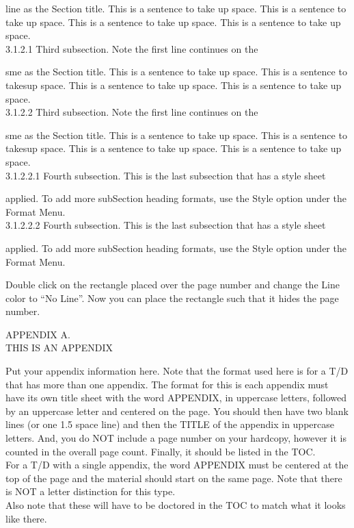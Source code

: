 \documentclass{article}
\newcommand{\tab}{\hspace{5mm}}
\begin{document}
line as the Section title. This is a sentence to take up space. 
This is a sentence to take up space. This is a sentence to take 
up space. This is a sentence to take up space.\\
3.1.2.1\tab 
Third subsection. Note the first line continues on the


sme as the Section title. This is a sentence to take up space. 
This is a sentence to takesup space. This is a sentence to take 
up space. This is a sentence to take up space.\\
3.1.2.2\tab 
Third subsection. Note the first line continues on the


sme as the Section title. This is a sentence to take up space. 
This is a sentence to takesup space. This is a sentence to take 
up space. This is a sentence to take up space.\\
3.1.2.2.1\tab 
Fourth subsection. This is the last subsection that has a style 
sheet 


applied. To add more subSection heading formats, use the Style 
option under the Format Menu.\\
3.1.2.2.2\tab 
Fourth subsection. This is the last subsection that has a style 
sheet 


applied. To add more subSection heading formats, use the Style 
option under the Format Menu.


\newpage

Double click on the rectangle placed over the page number and 
change the Line color to ``No Line''. Now you can place the rectangle 
such that it hides the page number.


APPENDIX A.\\
THIS IS AN APPENDIX


\newpage
Put your appendix information here. Note that the format used 
here is for a T/D that has more than one appendix. The format 
for this is each appendix must have its own title sheet with 
the word APPENDIX, in uppercase letters, followed by an uppercase 
letter and centered on the page. You should then have two blank 
lines (or one 1.5 space line) and then the TITLE of the appendix 
in uppercase letters. And, you do NOT include a page number on 
your hardcopy, however it is counted in the overall page count. 
Finally, it should be listed in the TOC.\\
For a T/D with a single appendix, the word APPENDIX must be centered 
at the top of the page and the material should start on the same 
page. Note that there is NOT a letter distinction for this type.\\
Also note that these will have to be doctored in the TOC to match 
what it looks like there.
\end{document}

